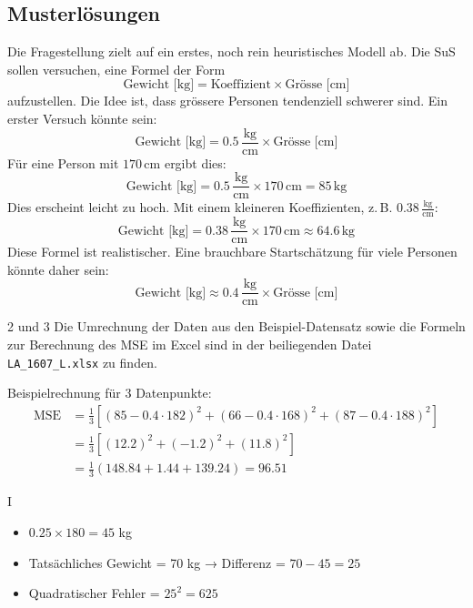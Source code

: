 \subsection*{Musterlösungen}

\begin{aufgabe}{1}
Die Fragestellung zielt auf ein erstes, noch rein heuristisches Modell ab. 
Die SuS sollen versuchen, eine Formel der Form
\[
\text{Gewicht [kg]} = \text{Koeffizient} \times \text{Grösse [cm]}
\]
aufzustellen. Die Idee ist, dass grössere Personen tendenziell schwerer sind. 
Ein erster Versuch könnte sein:
\[
\text{Gewicht [kg]} = 0.5 \,\frac{\text{kg}}{\text{cm}} \times \text{Grösse [cm]}
\]
Für eine Person mit \(170\,\text{cm}\) ergibt dies:
\[
\text{Gewicht [kg]} = 0.5 \,\frac{\text{kg}}{\text{cm}} \times 170\,\text{cm} = 85\,\text{kg}
\]
Dies erscheint leicht zu hoch. Mit einem kleineren Koeffizienten, 
z.\,B. \(0.38\,\tfrac{\text{kg}}{\text{cm}}\):
\[
\text{Gewicht [kg]} = 0.38 \,\frac{\text{kg}}{\text{cm}} \times 170\,\text{cm} 
\approx 64.6\,\text{kg}
\]
Diese Formel ist realistischer. Eine brauchbare Startschätzung für viele Personen 
könnte daher sein:
\[
\boxed{\text{Gewicht [kg]} \approx 0.4 \,\frac{\text{kg}}{\text{cm}} \times \text{Grösse [cm]}}
\]
\end{aufgabe}


\begin{aufgabe}{2 und 3}
Die Umrechnung der Daten aus den Beispiel-Datensatz sowie die Formeln zur Berechnung des MSE im Excel sind in der beiliegenden Datei \texttt{LA\_1607\_L.xlsx} zu finden.

Beispielrechnung für 3 Datenpunkte:
\begin{align*}
\text{MSE} &= \frac{1}{3} \left[(85 - 0.4 \cdot 182)^2 + (66 - 0.4 \cdot 168)^2 + (87 - 0.4 \cdot 188)^2 \right] \\
&= \frac{1}{3} \left[(12.2)^2 + (-1.2)^2 + (11.8)^2\right] \\
&= \frac{1}{3} (148.84 + 1.44 + 139.24) = \boxed{96.51}
\end{align*}
\end{aufgabe}

\begin{aufgabe}{I}
\begin{itemize}
  \item $0.25 \times 180 = 45$ kg  
  \item Tatsächliches Gewicht = 70 kg → Differenz = $70 - 45 = 25$
  \item Quadratischer Fehler = $25^2 = 625$
\end{itemize}
\end{aufgabe}

